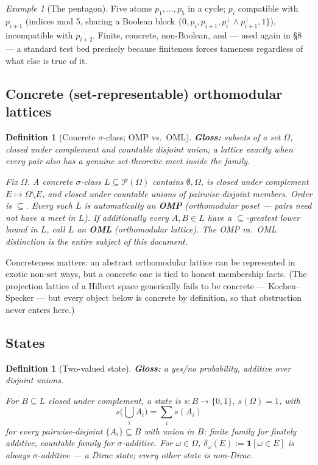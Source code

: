 \documentclass[11pt]{article}
\newtheorem{definition}[theorem]{Definition}
\theoremstyle{remark}
\newtheorem{example}[theorem]{Example}
\begin{document}
\begin{example}[The pentagon]
\label{ex:pentagon}
Five atoms $p_1,\dots,p_5$ in a cycle; $p_i$ compatible with $p_{i+1}$ (indices
mod 5, sharing a Boolean block $\{0,p_i,p_{i+1},p_i^\perp\wedge
p_{i+1}^\perp,1\}$), incompatible with $p_{i+2}$. Finite, concrete,
non-Boolean, and — used again in \S8 — a standard test bed precisely because
finiteness forces tameness regardless of what else is true of it.
\end{example}

\subsection{Concrete (set-representable) orthomodular lattices}

\begin{definition}[Concrete $\sigma$-class; OMP vs.\ OML]
\label{def:concrete}
\textbf{Gloss:} subsets of a set $\Omega$, closed under complement and
countable disjoint union; a lattice exactly when every pair also has a
genuine set-theoretic meet inside the family.

\smallskip
\noindent Fix $\Omega$. A \emph{concrete $\sigma$-class} $L\subseteq
\mathcal P(\Omega)$ contains $\emptyset,\Omega$, is closed under
complement $E\mapsto\Omega\setminus E$, and closed under countable unions of
pairwise-disjoint members. Order is $\subseteq$. Every such $L$ is
automatically an \textbf{OMP} (orthomodular poset — pairs need not have a
meet in $L$). If additionally every $A,B\in L$ have a $\subseteq$-greatest
lower bound in $L$, call $L$ an \textbf{OML} (orthomodular lattice). The OMP
vs.\ OML distinction is the entire subject of this document.
\end{definition}

Concreteness matters: an abstract orthomodular lattice can be represented in
exotic non-set ways, but a concrete one is tied to honest membership facts.
(The projection lattice of a Hilbert space generically fails to be concrete —
Kochen--Specker — but every object below is concrete by definition, so that
obstruction never enters here.)

\subsection{States}

\begin{definition}[Two-valued state]
\label{def:state}
\textbf{Gloss:} a yes/no probability, additive over disjoint unions.

\smallskip
\noindent For $B\subseteq L$ closed under complement, a state is
$s:B\to\{0,1\}$, $s(\Omega)=1$, with
\[
  s\Big(\bigcup_i A_i\Big) = \sum_i s(A_i)
\]
for every pairwise-disjoint $\{A_i\}\subseteq B$ with union in $B$: finite
family for \emph{finitely additive}, countable family for
\emph{$\sigma$-additive}. For $\omega\in\Omega$, $\delta_\omega(E) :=
\mathbf 1[\omega\in E]$ is always $\sigma$-additive — a \emph{Dirac} state;
every other state is \emph{non-Dirac}.
\end{definition}
\end{document}
